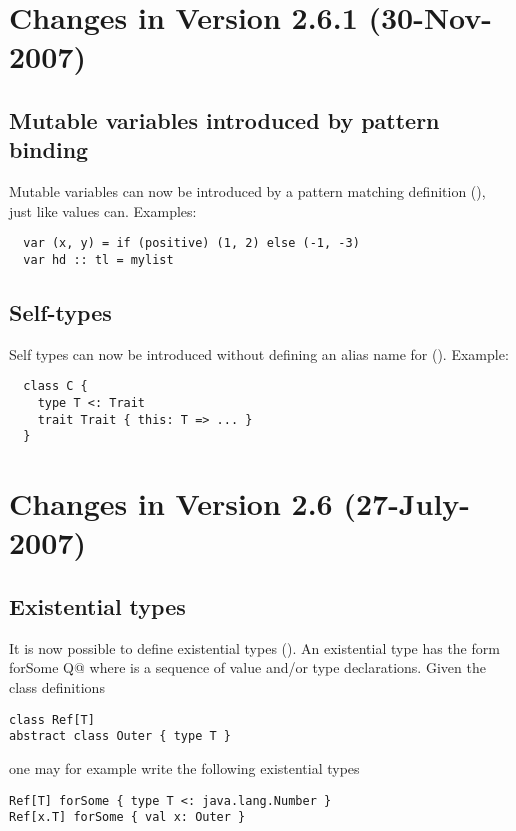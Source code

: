 \section*{Changes in Version 2.6.1 (30-Nov-2007)}

\subsection*{Mutable variables introduced by pattern binding}

Mutable variables can now be introduced by a pattern matching
definition (), just like values can. Examples:
\begin{lstlisting}
  var (x, y) = if (positive) (1, 2) else (-1, -3)
  var hd :: tl = mylist
\end{lstlisting}

\subsection*{Self-types}

Self types can now be introduced without defining an alias name for
\lstinline@this@ (). Example:
\begin{lstlisting}
  class C {
    type T <: Trait
    trait Trait { this: T => ... }
  }
\end{lstlisting}

\section*{Changes in Version 2.6 (27-July-2007)}

\subsection*{Existential types}

It is now possible to define existential types
().
An existential type has the form \lstinline@T forSome {Q}@ where
\lstinline@Q@ 
is a sequence of value and/or type declarations. Given the class definitions
\begin{lstlisting}
class Ref[T]
abstract class Outer { type T }
\end{lstlisting}
one may for example write the following existential types
\begin{lstlisting}
Ref[T] forSome { type T <: java.lang.Number }
Ref[x.T] forSome { val x: Outer }
\end{lstlisting}

